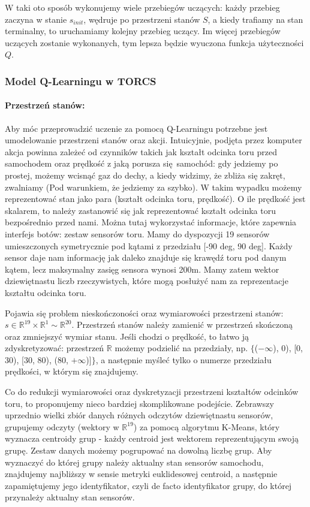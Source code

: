 \documentclass{article}
\begin{document}
W taki oto sposób wykonujemy wiele przebiegów uczących: każdy przebieg zaczyna w stanie $s_{init}$, wędruje po przestrzeni stanów $S$, a kiedy trafiamy na stan terminalny, to uruchamiamy kolejny przebieg uczący. Im więcej przebiegów uczących zostanie wykonanych, tym lepsza będzie wyuczona funkcja użyteczności $Q$.

\subsubsection{Model Q-Learningu w TORCS}

\paragraph{Przestrzeń stanów:}
Aby móc przeprowadzić uczenie za pomocą Q-Learningu potrzebne jest umodelowanie przestrzeni stanów oraz akcji. Intuicyjnie, podjęta przez komputer akcja powinna zależeć od czynników takich jak kształt odcinka toru przed samochodem oraz prędkość z jaką porusza się samochód: gdy jedziemy po prostej, możemy wcisnąć gaz do dechy, a kiedy widzimy, że zbliża się zakręt, zwalniamy (Pod warunkiem, że jedziemy za szybko). W takim wypadku możemy reprezentować stan jako para (kształt odcinka toru, prędkość). O ile prędkość jest skalarem, to należy zastanowić się jak reprezentować kształt odcinka toru bezpośrednio przed nami. Można tutaj wykorzystać informacje, które zapewnia interfejs botów: zestaw sensorów toru. Mamy do dyspozycji 19 sensorów umieszczonych symetrycznie pod kątami z przedziału [-90 deg, 90 deg]. Każdy sensor daje nam informację jak daleko znajduje się krawędź toru pod danym kątem, lecz maksymalny zasięg sensora wynosi 200m. Mamy zatem wektor dziewiętnastu liczb rzeczywistych, które mogą posłużyć nam za reprezentacje kształtu odcinka toru. 

Pojawia się problem nieskończoności oraz wymiarowości przestrzeni stanów: $s \in \mathbb{R}^{19} \times \mathbb{R}^{1} \sim \mathbb{R}^{20}$. Przestrzeń stanów należy zamienić w przestrzeń skończoną oraz zmniejszyć wymiar stanu. Jeśli chodzi o prędkość, to łatwo ją zdyskretyzować: przestrzeń $\mathbb{R}$ możemy podzielić na przedziały, np. $\{$($-\infty$), 0), [0, 30), [30, 80), (80, $+\infty$)]$\}$, a następnie myśleć tylko o numerze przedziału prędkości, w którym się znajdujemy.

Co do redukcji wymiarowości oraz dyskretyzacji przestrzeni kształtów odcinków toru, to proponujemy nieco bardziej skomplikowane podejście. Zebrawszy uprzednio wielki zbiór danych różnych odczytów dziewiętnastu sensorów, grupujemy odczyty (wektory w $\mathbb{R}^{19}$) za pomocą algorytmu K-Means, który wyznacza centroidy grup - każdy centroid jest wektorem reprezentującym swoją grupę. Zestaw danych możemy pogrupować na dowolną liczbę grup. Aby wyznaczyć do której grupy należy aktualny stan sensorów samochodu, znajdujemy najbliższy w sensie metryki euklidesowej centroid, a następnie zapamiętujemy jego identyfikator, czyli de facto identyfikator grupy, do której przynależy aktualny stan sensorów.
\end{document}
